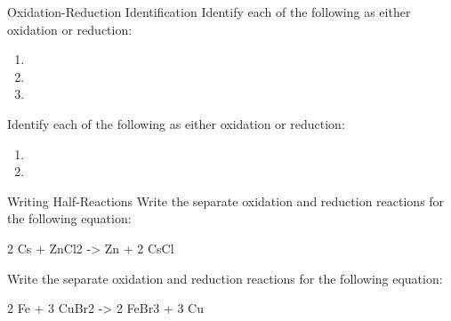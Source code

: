 \documentclass[notes=hide]{beamer}
\begin{document}
\begin{frame}[t]{Oxidation-Reduction Identification}
	Identify each of the following as either oxidation or reduction:

	\begin{enumerate}
		\item {}

			\bigskip

		\item {}

			\bigskip

		\item {}

			\bigskip
	\end{enumerate}
\end{frame}


\begin{onyourown}[0em]
	Identify each of the following as either oxidation or reduction:

	\begin{enumerate}
		\item {}

			\bigskip

		\item {}
			\bigskip
	\end{enumerate}
\end{onyourown}

\begin{frame}[t]{Writing Half-Reactions}
	Write the separate oxidation and reduction reactions for the following
	equation:
	\begin{reaction*}
		2 Cs\sld{} + ZnCl2\aq{} -> Zn\sld{} + 2 CsCl\aq{}
	\end{reaction*}

	\note{
		\begin{reactions*}
			2 Cs\sld{} &-> 2 Cs^{+}\sld{} + 2 \el{} \\
			Zn^{2+}\aq{} + 2 \el{} &-> Zn\sld{}
		\end{reactions*}
		}
\end{frame}

\begin{onyourown}
	Write the separate oxidation and reduction reactions for the following
	equation:
	\begin{reaction*}
		2 Fe\sld{} + 3 CuBr2\aq{} -> 2 FeBr3\aq{} + 3 Cu\sld{}
	\end{reaction*}
\end{onyourown}
\end{document}
